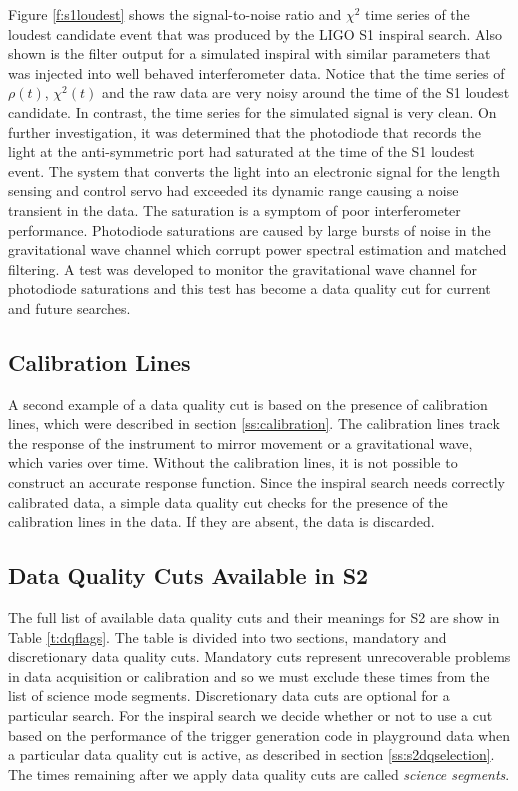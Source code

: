 Figure \ref{f:s1loudest} shows the signal-to-noise ratio and $\chi^2$ time
series of the loudest candidate event that was produced by the LIGO S1
inspiral search\cite{LIGOS1iul}. Also shown is the filter output for a simulated inspiral
with similar parameters that was injected into well behaved
interferometer data.  Notice that the time series of $\rho(t)$, $\chi^2(t)$
and the raw data are very noisy around the time of the S1 loudest candidate.
In contrast, the time series for the simulated signal is very clean. On
further investigation, it was determined that the photodiode that records the
light at the anti-symmetric port had saturated at the time of the S1 loudest
event. The system that converts the light into an electronic signal for the
length sensing and control servo had exceeded its dynamic range causing a
noise transient in the data.  The saturation is a symptom of poor
interferometer performance. Photodiode saturations are caused by large bursts
of noise in the gravitational wave channel which corrupt power spectral
estimation and matched filtering. A test was developed to monitor the
gravitational wave channel for photodiode saturations and this test has become
a data quality cut for current and future searches.

\subsection{Calibration Lines}
\label{ss:calcut}

A second example of a data quality cut is based on the presence of calibration
lines, which were described in section \ref{ss:calibration}. The calibration
lines track the response of the instrument to mirror movement or a
gravitational wave, which varies over time. Without the calibration lines, it
is not possible to construct an accurate response function. Since the inspiral
search needs correctly calibrated data, a simple data quality cut checks for
the presence of the calibration lines in the data. If they are absent, the
data is discarded.

\subsection{Data Quality Cuts Available in S2}
\label{ss:s2dq}

The full list of available data quality cuts and their meanings for S2 are
show in Table \ref{t:dqflags}. The table is divided into two sections,
mandatory and discretionary data quality cuts. Mandatory cuts represent
unrecoverable problems in data acquisition or calibration and so we must exclude
these times from the list of science mode segments. Discretionary data cuts
are optional for a particular search. For the inspiral search we decide
whether or not to use a cut based on the performance of the trigger generation
code in playground data when a particular data quality cut is active, as
described in section \ref{ss:s2dqselection}.  The times remaining after we
apply data quality cuts are called \emph{science segments}.

